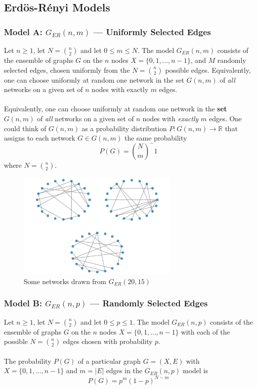 \documentclass[a4paper,11pt]{article}
\begin{document}
\subsection{Erd\"os-Rényi Models}
\subsubsection{Model A: $G_{ER}(n,m)$ --- Uniformly Selected Edges}
Let $n \geq 1$, let $N = \binom{n}{2}$ and let $0 \leq m \leq N$.
The model $G_{ER}(n,m)$ consists of the ensemble of graphs $G$ on the $n$ nodes $X = \{0,1, \dots, n-1\}$, and $M$ randomly selected edges, chosen uniformly from the $N = \binom{n}{2}$  possible edges.
Equivalently, one can choose uniformly at random one network in the set $G(n,m)$ of \textit{all} networks on a given set of $n$ nodes with exactly $m$ edges.
\\\\
Equivalently, one can choose uniformly at random one network in the \textbf{set} $G(n,m)$ of \textit{all} networks on a given set of $n$ nodes with \textit{exactly} $m$ edges.
One could think of $G(n,m)$ as a probability distribution $P: G(n,m) \rightarrow \mathbb{R}$ that assigns to each network $G \in G(n,m)$ the same probability
\[
    P(G) = \binom{N}{m}^-1
\]
where $N = \binom{n}{2}$.

\begin{figure}[H]
    \centering
    \includegraphics[width=0.7\textwidth]{./images/gnm.png}
    \caption{ Some networks drawn from $G_{ER}(20,15)$ }
\end{figure}


\subsubsection{Model B: $G_{ER}(n,p)$ --- Randomly Selected Edges}
Let $n \geq 1$, let $N = \binom{n}{2}$ and let $0 \leq p \leq 1$.
The model $G_{ER}(n,p)$ consists of the ensemble of graphs $G$ on the $n$ nodes $X=\{0,1, \dots, n-1\}$ with each of the possible $N=\binom{n}{2}$ edges chosen with probability $p$.
\\\\
The probability $P(G)$ of a particular graph $G=(X,E)$ with $X=\{0,1, \dots, n-1\}$ and $m = |E|$ edges in the $G_{ER}(n,p)$ model is
\[
    P(G) = p^m(1-p)^{N-m}
\]
\end{document}
